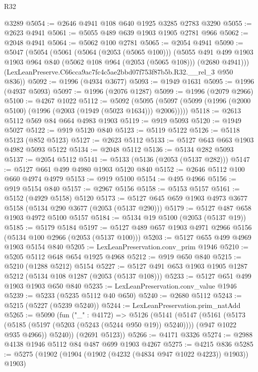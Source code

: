 \begin{lexlean}{R32}
\begin{coremodule}
    @3289
@5054 := @2646 @4941 @108 @640 @1925 @3285 @2783 @3290
@5055 := @2623 @4941
@5061 := @5055 @489 @639 @1903 @1905 @2781 @966
@5062 := @2048 @4941
@5064 := @5062 @100 @2781
@5065 := @2054 @4941
@5090 := @5047
    (@5054
      (@5061
        (@5064 (@2053 (@5065 @100)))
        (@5055
          @491
          @499
          @1903
          @1903
          @964
          @840
          (@5062 @108 @964 (@2053 (@5065 @108)))
          (@2680 @4941)))
      (LexLeanPreserve.C66cca9ac7fc4c5ae2bbd07f753f87b5b.R32.__rel_3 @950 @836))
@5092 := @1996 (@4934 @3677)
@5093 := @1949 @1631
@5095 := @1996 (@4937 @5093)
@5097 := @1996 (@2076 @1287)
@5099 := @1996 (@2079 @2966)
@5100 := @4267 @1022
@5112 := @5092
    (@5095 (@5097 (@5099 (@1996 (@2000 @5100) (@1996 (@2003 (@1949 (@5023 @1634))) @2006)))))
@5118 := @2613 @5112 @569 @84 @664 @4983 @1903
@5119 := @919 @5093
@5120 := @1949 @5027
@5122 := @919 @5120 @840
@5123 := @5119 @5122
@5126 := @5118 @5123 (@852 @5123)
@5127 := @2623 @5112
@5133 := @5127 @643 @663 @1903 @4982 @5093 @5122
@5134 := @2048 @5112
@5136 := @5134 @282 @5093
@5137 := @2054 @5112
@5141 := @5133 (@5136 (@2053 (@5137 @282)))
@5147 := @5127 @661 @499 @4980 @1903 @5120 @840
@5152 := @2646 @5112 @100 @660 @4974 @4979
@5153 := @919 @5100
@5154 := @495 @4966
@5156 := @919 @5154 @840
@5157 := @2967 @5156
@5158 := @5153 @5157
@5161 := @5152 (@4929 @5158) @5120
@5173 := @5127 @645 @659 @1903 @4973 @3677 @5158 (@5134 @290 @3677 (@2053 (@5137 @290)))
@5179 := @5127 @487 @658 @1903 @4972 @5100 @5157
@5184 := @5134 @19 @5100 (@2053 (@5137 @19))
@5185 := @5179 @5184
@5197 := @5127 @489 @657 @1903 @4971 @2966 @5156 (@5134 @100 @2966 (@2053 (@5137 @100)))
@5203 := @5127 @655 @499 @4969 @1903 @5154 @840
@5205 := LexLeanPreservation.conv_prim @1946
@5210 := @5205 @5112 @648 @654 @1925 @4968
@5212 := @919 @650 @840
@5215 := @5210 (@1288 @5212) @5154
@5227 := @5127 @491 @653 @1903 @1905 @1287 @5212 (@5134 @108 @1287 (@2053 (@5137 @108)))
@5233 := @5127 @651 @499 @1903 @1903 @650 @840
@5235 := LexLeanPreservation.conv_value @1946
@5239 := @5233 (@5235 @5112 @40 @650)
@5240 := @2680 @5112
@5243 := @5215 (@5227 (@5239 @5240))
@5244 := LexLeanPreservation.prim_natAdd
@5265 := @5090
    (fun ("_" : @4172) =>
    @5126
      (@5141
        (@5147
          (@5161
            (@5173 (@5185 (@5197 (@5203 (@5243 (@5244 @950 @19)) @5240))))
            (@947 @1022 @935 @4966))
          @5240))
      (@2691 @5123))
@5266 := @4171 @3326
@5274 := @2988 @4138 @1946 @5112 @84 @487 @699 @1903 @4267
@5275 := @4215 @836
@5285 := @5275 (@1902 (@1904 (@1902 (@4232 (@4834 @947 @1022 @4223)) @1903)) @1903)

\end{coremodule}
\end{lexlean}
